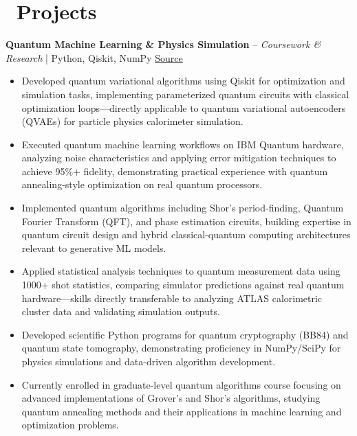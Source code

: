 \documentclass[11pt]{article}
\begin{document}
\newpage %

\section*{\faLaptopCode\ Projects}

\textbf{Quantum Machine Learning \& Physics Simulation} -- \textit{Coursework \& Research} | Python, Qiskit, NumPy \hfill \href{https://github.com/isaac-preyser/PHYS223}{\underline{Source \faGithub}}
\begin{itemize}
    \item Developed quantum variational algorithms using Qiskit for optimization and simulation tasks, implementing parameterized quantum circuits with classical optimization loops—directly applicable to quantum variational autoencoders (QVAEs) for particle physics calorimeter simulation.
    \item Executed quantum machine learning workflows on IBM Quantum hardware, analyzing noise characteristics and applying error mitigation techniques to achieve 95\%+ fidelity, demonstrating practical experience with quantum annealing-style optimization on real quantum processors.
    \item Implemented quantum algorithms including Shor's period-finding, Quantum Fourier Transform (QFT), and phase estimation circuits, building expertise in quantum circuit design and hybrid classical-quantum computing architectures relevant to generative ML models.
    \item Applied statistical analysis techniques to quantum measurement data using 1000+ shot statistics, comparing simulator predictions against real quantum hardware—skills directly transferable to analyzing ATLAS calorimetric cluster data and validating simulation outputs.
    \item Developed scientific Python programs for quantum cryptography (BB84) and quantum state tomography, demonstrating proficiency in NumPy/SciPy for physics simulations and data-driven algorithm development.
    \item Currently enrolled in graduate-level quantum algorithms course focusing on advanced implementations of Grover's and Shor's algorithms, studying quantum annealing methods and their applications in machine learning and optimization problems.
\end{itemize}

\vspace{6pt}
\end{document}
